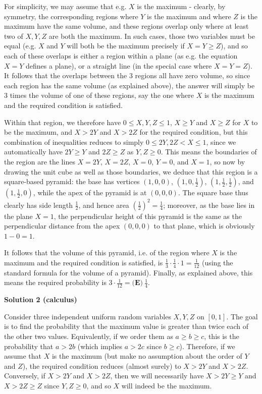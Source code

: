 \begin{enumerate}
 For simplicity, we may assume that e.g. $X$ is the maximum - clearly, by symmetry, the corresponding regions where $Y$ is the maximum and where $Z$ is the maximum have the same volume, and these regions overlap only where at least two of $X,Y,Z$ are both the maximum. In such cases, those two variables must be equal (e.g. $X$ and $Y$ will both be the maximum precisely if $X = Y \geq Z$), and so each of these overlaps is either a region within a plane (as e.g. the equation $X = Y$ defines a plane), or a straight line (in the special case where $X = Y = Z$). It follows that the overlaps between the $3$ regions all have zero volume, so since each region has the same volume (as explained above), the answer will simply be $3$ times the volume of one of these regions, say the one where $X$ is the maximum and the required condition is satisfied.

 Within that region, we therefore have $0 \leq X,Y,Z \leq 1$, $X \geq Y$ and $X \geq Z$ for $X$ to be the maximum, and $X > 2Y$ and $X > 2Z$ for the required condition, but this combination of inequalities reduces to simply $0 \leq 2Y,2Z < X \leq 1$, since we automatically have $2Y \geq Y$ and $2Z \geq Z$ as $Y,Z \geq 0$. This means the boundaries of the region are the lines $X = 2Y$, $X = 2Z$, $X = 0$, $Y = 0$, and $X = 1$, so now by drawing the unit cube as well as those boundaries, we deduce that this region is a square-based pyramid: the base has vertices $\left(1,0,0\right)$, $\left(1,0,\frac{1}{2}\right)$, $\left(1,\frac{1}{2},\frac{1}{2}\right)$, and $\left(1,\frac{1}{2},0\right)$, while the apex of the pyramid is at $(0,0,0)$. The square base thus clearly has side length $\frac{1}{2}$, and hence area $\left(\frac{1}{2}\right)^2 = \frac{1}{4}$; moreover, as the base lies in the plane $X = 1$, the perpendicular height of this pyramid is the same as the perpendicular distance from the apex $(0,0,0)$ to that plane, which is obviously $1-0 = 1$.

 It follows that the volume of this pyramid, i.e. of the region where $X$ is the maximum and the required condition is satisfied, is $\frac{1}{3} \cdot \frac{1}{4} \cdot 1 = \frac{1}{12}$ (using the standard formula for the volume of a pyramid). Finally, as explained above, this means the required probability is $3 \cdot \frac{1}{12} = \boxed{\textbf{(E)}~\frac14}$.

 



\textbf{Solution 2 (calculus)}

Consider three independent uniform random variables $X, Y, Z$ on $[0, 1]$. The goal is to find the probability that the maximum value is greater than twice each of the other two values. Equivalently, if we order them as $a \geq b \geq c$, this is the probability that $a > 2b$ (which implies $a > 2c$ since $b \geq c$). Therefore, if we assume that $X$ is the maximum (but make no assumption about the order of $Y$ and $Z$), the required condition reduces (almost surely) to $X > 2Y$ and $X > 2Z$. Conversely, if $X > 2Y$ and $X > 2Z$, then we will necessarily have $X > 2Y \geq Y$ and $X > 2Z \geq Z$ since $Y,Z \geq 0$, and so $X$ will indeed be the maximum.


\end{enumerate}

